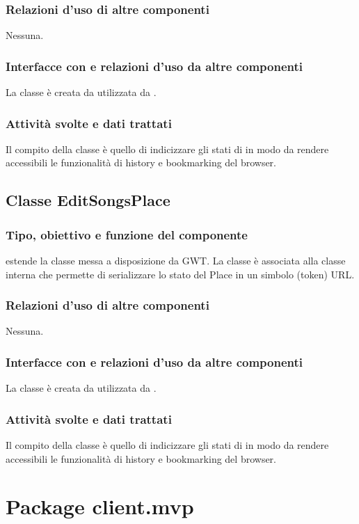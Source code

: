 \subsubsection*{Relazioni d'uso di altre componenti}
Nessuna.
\subsubsection*{Interfacce con e relazioni d'uso da altre componenti}
La classe \`e creata da  utilizzata da .
\subsubsection*{Attivit\`a svolte e dati trattati}
Il compito della classe \`e quello di indicizzare gli stati di
 in modo da rendere accessibili le funzionalit\`a di
history e bookmarking del browser.

\subsection{Classe EditSongsPlace}
\subsubsection*{Tipo, obiettivo e funzione del componente}
 estende la classe  messa a disposizione da GWT. La
classe \`e associata alla classe interna  che permette di
serializzare lo stato del Place in un simbolo (token) URL.
\subsubsection*{Relazioni d'uso di altre componenti}
Nessuna.
\subsubsection*{Interfacce con e relazioni d'uso da altre componenti}
La classe \`e creata da  utilizzata da .
\subsubsection*{Attivit\`a svolte e dati trattati}
Il compito della classe \`e quello di indicizzare gli stati di
 in modo da rendere accessibili le funzionalit\`a di
history e bookmarking del browser.

\newpage
\section{Package client.mvp} %

